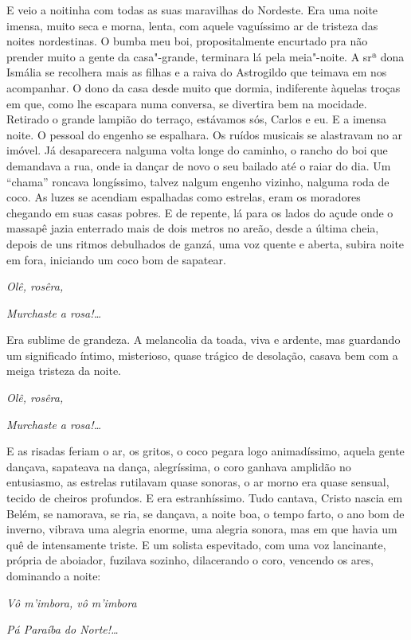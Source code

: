 E veio a noitinha com todas as suas maravilhas do Nordeste. Era uma
noite imensa, muito seca e morna, lenta, com aquele vaguíssimo ar de
tristeza das noites nordestinas. O bumba meu boi, propositalmente
encurtado pra não prender muito a gente da casa"-grande, terminara lá
pela meia"-noite. A srª dona Ismália se recolhera mais as filhas e a
raiva do Astrogildo que teimava em nos acompanhar. O dono da casa desde
muito que dormia, indiferente àquelas troças em que, como lhe escapara
numa conversa, se divertira bem na mocidade. Retirado o grande lampião
do terraço, estávamos sós, Carlos e eu. E a imensa noite. O pessoal do
engenho se espalhara. Os ruídos musicais se alastravam no ar imóvel. Já
desaparecera nalguma volta longe do caminho, o rancho do boi que
demandava a rua, onde ia dançar de novo o seu bailado até o raiar do
dia. Um ``chama'' roncava longíssimo, talvez nalgum engenho vizinho,
nalguma roda de coco. As luzes se acendiam espalhadas como estrelas,
eram os moradores chegando em suas casas pobres. E de repente, lá para
os lados do açude onde o massapê jazia enterrado mais de dois metros no
areão, desde a última cheia, depois de uns ritmos debulhados de ganzá,
uma voz quente e aberta, subira noite em fora, iniciando um coco bom de
sapatear.

\emph{Olê, rosêra,}

\emph{Murchaste a rosa!\ldots{}}

Era sublime de grandeza. A melancolia da toada, viva e ardente, mas
guardando um significado íntimo, misterioso, quase trágico de desolação,
casava bem com a meiga tristeza da noite.

\emph{Olê, rosêra,}

\emph{Murchaste a rosa!\ldots{}}

E as risadas feriam o ar, os gritos, o coco pegara logo animadíssimo,
aquela gente dançava, sapateava na dança, alegríssima, o coro ganhava
amplidão no entusiasmo, as estrelas rutilavam quase sonoras, o ar morno
era quase sensual, tecido de cheiros profundos. E era estranhíssimo.
Tudo cantava, Cristo nascia em Belém, se namorava, se ria, se dançava, a
noite boa, o tempo farto, o ano bom de inverno, vibrava uma alegria
enorme, uma alegria sonora, mas em que havia um quê de intensamente
triste. E um solista espevitado, com uma voz lancinante, própria de
aboiador, fuzilava sozinho, dilacerando o coro, vencendo os ares,
dominando a noite:

\emph{Vô m'imbora, vô m'imbora}

\emph{Pá Paraíba do Norte!\ldots{}}

